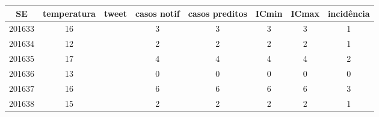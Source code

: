 \begin{tabular}{c|ccccccc}
  \hline
SE & temperatura & tweet & casos notif & casos preditos & ICmin & ICmax & incidência \\ 
  \hline
201633 & 16 &  & 3 & 3 & 3 & 3 & 1 \\ 
  201634 & 12 &  & 2 & 2 & 2 & 2 & 1 \\ 
  201635 & 17 &  & 4 & 4 & 4 & 4 & 2 \\ 
  201636 & 13 &  & 0 & 0 & 0 & 0 & 0 \\ 
  201637 & 16 &  & 6 & 6 & 6 & 6 & 3 \\ 
  201638 & 15 &  & 2 & 2 & 2 & 2 & 1 \\ 
   \hline
\end{tabular}
